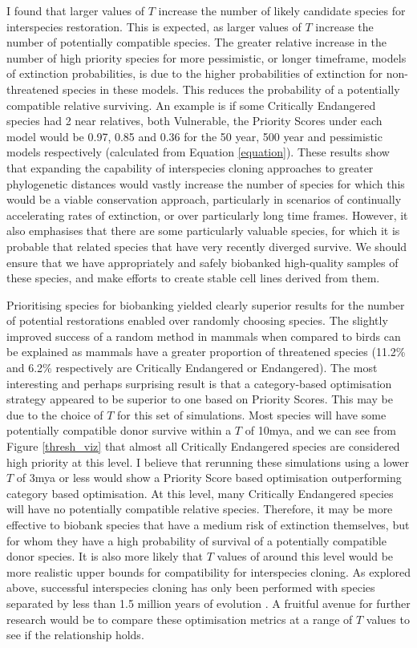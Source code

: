 \documentclass[12pt]{article}
\begin{document}
	I
	found that
	larger values of $T$ increase the number of likely candidate species
	for interspecies restoration. This is
	expected, as larger values of $T$ increase the number of potentially
	compatible species. The greater relative increase in the number of high priority
	species for more pessimistic, or longer timeframe, models of extinction
	probabilities, is due to the higher probabilities of extinction for non-threatened
	species in these models. This reduces the probability of a potentially
	compatible relative surviving.
	An example is if some Critically Endangered species had 2 near relatives,
	both Vulnerable, the Priority Scores
	under each model would be 0.97, 0.85 and 0.36 for the 50 year, 500 year and
	pessimistic models respectively (calculated from Equation \ref{equation}).
	These results
	show that expanding
	the capability of interspecies cloning approaches to greater phylogenetic
	distances would vastly increase the number of species for which this would be
	a viable conservation approach, particularly in scenarios of continually
	accelerating rates of extinction, or over particularly long time frames.
	However, it also emphasises that there are some particularly
	valuable species, for which it is probable that related species that
	have very recently diverged survive. We should ensure that we have
	appropriately and safely biobanked high-quality samples of these species,
	and make efforts to create stable cell lines derived from them.
	
	Prioritising species for biobanking yielded clearly
	superior results for the number of potential restorations enabled
	over randomly choosing species. The slightly improved
	success of a random method in mammals when compared to birds can be
	explained as mammals have a greater proportion of threatened
	species (11.2\% and 6.2\% respectively are Critically Endangered
	or Endangered). The most interesting and perhaps surprising result is
	that a category-based optimisation strategy appeared to be superior to
	one based on Priority Scores. This may be due to the choice of $T$ for
	this set of simulations. Most species will have
	some potentially compatible donor survive within a $T$ of 10mya, and we
	can see from Figure \ref{thresh_viz} that almost all Critically
	Endangered species are considered high priority at this level. I
	believe that rerunning these simulations using a lower $T$ of
	3mya or less would show a Priority Score based optimisation
	outperforming category based optimisation. At this level, many
	Critically Endangered species will have no potentially compatible
	relative species. Therefore, it may be more effective to biobank
	species that have a medium risk of extinction themselves, but for
	whom they have a high probability of survival of a potentially
	compatible donor species.
	It is also more likely that $T$ values of around this level would
	be more realistic upper bounds for compatibility for interspecies
	cloning. As explored above, successful interspecies cloning
	has only been performed with species separated by less than 1.5
	million years of evolution \cite{sandlerEthicalAnalysisCloning2021}.
	A fruitful avenue for
	further research would be to compare these optimisation metrics
	at a range of $T$ values to see if the relationship holds.
	
\end{document}
